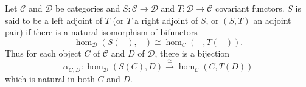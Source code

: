 Let $\mathcal{C}$ and $\mathcal{D}$ be categories and $S : \mathcal{C} \to \mathcal{D}$ and $T : \mathcal{D} \to \mathcal{C}$ covariant functors. $S$ is said to be a left adjoint of $T$ (or $T$ a right adjoint of $S$, or $(S,T)$ an adjoint pair) if there is a natural isomorphism of bifunctors
\[
\hom_{\mathcal{D}}(S(-), -) \cong \hom_{\mathcal{C}}(-, T(-)).
\]
Thus for each object $C$ of $\mathcal{C}$ and $D$ of $\mathcal{D}$, there is a bijection
\[
\alpha_{C,D} : \hom_{\mathcal{D}}(S(C), D) \xrightarrow{\cong} \hom_{\mathcal{C}}(C, T(D))
\]
which is natural in both $C$ and $D$.
